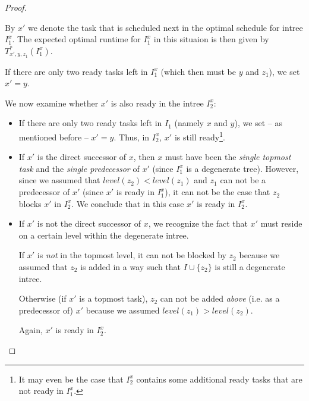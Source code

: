 \begin{proof}
\begin{itemize}
    By $x'$ we denote the task that is scheduled next in the optimal schedule for intree $I_1^x$. 
    The expected optimal runtime for $I_1^x$ in this situaion is then given by $T_{x',y,z_1}^*(I_1^x)$.

    If there are only two ready tasks left in $I_1^x$ (which then must be $y$ and $z_1$), we set $x'=y$. 

    We now examine whether $x'$ is also ready in the intree $I_2^x$:
    \begin{itemize}
    \item If there are only two ready tasks left in $I_1$ (namely $x$ and $y$), we set -- as mentioned before -- $x'=y$. Thus, in $I_2^x$, $x'$ is still ready\footnote{It may even be the case that $I_2^x$ contains some additional ready tasks that are not ready in $I_1^x$.}.
    \item If $x'$ is the direct successor of $x$, then $x$ must have been the \emph{single topmost task} and the \emph{single predecessor} of $x'$ (since $I_1^x$ is a degenerate tree). However, since we assumed that $level(z_2)<level(z_1)$ and $z_1$ can not be a predecessor of $x'$ (since $x'$ is ready in $I_1^x$), it can not be the case that $z_2$ blocks $x'$ in $I_2^x$. We conclude that in this case $x'$ is ready in $I_2^x$.

    \item If $x'$ is not the direct successor of $x$, we recognize the fact that $x'$ must reside on a certain level within the degenerate intree. 

      If $x'$ is \emph{not} in the topmost level, it can not be blocked by $z_2$ because we assumed that $z_2$ is added in a way such that $I\cup\{z_2\}$ is still a degenerate intree.

      Otherwise (if $x'$ is a topmost task), $z_2$ can not be added \emph{above} (i.e. as a predecessor of) $x'$ because we assumed $level(z_1)>level(z_2)$.

      Again, $x'$ is ready in $I_2^x$.


\end{itemize}
\end{itemize}
\end{proof}
